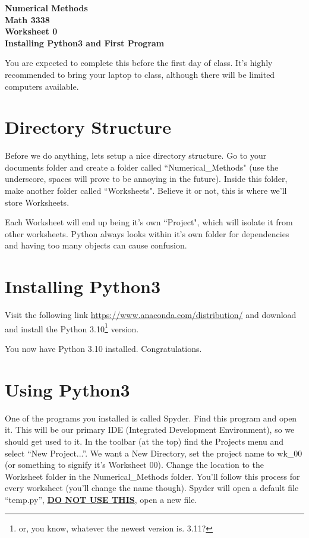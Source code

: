 \documentclass[11pt,letterpaper]{article}
\begin{document}
\begin{center}
{\huge{\bf  Numerical Methods}} \\[1.5ex]
{\bf Math 3338}\\[1.5ex]
{\Large{\bf Worksheet 0\ \\[2ex] Installing Python3 and First Program}}\\
\end{center}
\vspace{2mm}

You are expected to complete this before the first day of class. It's highly recommended to bring
your laptop to class, although there will be limited computers available.


\section{Directory Structure}
Before we do anything, lets setup a nice directory structure. Go to your documents folder and create a folder called ``Numerical\_Methods" (use the underscore, spaces will prove to be annoying in the future). Inside this folder, make another folder called ``Worksheets". Believe it or not, this is where we'll store Worksheets. 

Each Worksheet will end up being it's own ``Project", which will isolate it from other worksheets. Python always looks within it's own folder for dependencies and having too many objects can cause confusion.


\section{Installing Python3}

Visit the following link \url{https://www.anaconda.com/distribution/} and download and install 
the Python 3.10\footnote{or, you know, whatever the newest version is. 3.11?} version.

You now have Python 3.10 installed. Congratulations. 


\section{Using Python3}
One of the programs you installed is called Spyder. Find this program and open it. This will be our primary IDE (Integrated Development Environment), so we should get used to it. In the toolbar (at the top) find the Projects menu and select ``New Project...''. We want a New Directory, set the project name to wk\_00 (or something to signify it's Worksheet 00). Change the location to the Worksheet folder in the Numerical\_Methods folder. You'll follow this process for every worksheet (you'll change the name though). Spyder will open a default file ``temp.py'', \textbf{\underline{DO NOT USE THIS}}, open a new file. 
\end{document}
